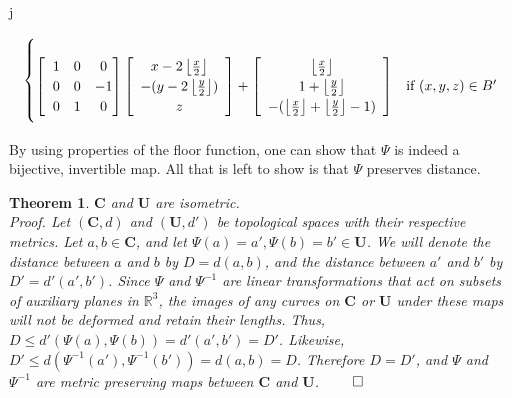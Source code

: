 j\documentclass[]{article}
\newtheorem{thm}{Theorem}[subsection]
\begin{document}
\begin{equation}
\begin{cases}
	\\
	
		\left[ \hspace{2mm} \begin{matrix}
			1 & 0 & 0 \\
			0 & 0 & -1 \\
			0 & 1 & 0
		\end{matrix}\hspace{0mm}\right]
	
		\left[\begin{array}{c}
		x - 2\left\lfloor \frac{x}{2} \right\rfloor
		\\ -(y- 2\left\lfloor \frac{y}{2} \right\rfloor)
		\\ z
		\end{array} \right]
		+
		\left[\begin{array}{c}
			\left\lfloor \frac{x}{2} \right\rfloor
			\\1+ \left\lfloor \frac{y}{2} \right\rfloor
			\\ -(\left\lfloor \frac{x}{2} \right\rfloor + \left\lfloor \frac{y}{2} \right\rfloor -1)
		\end{array} \right]
			& \text{if } (x,y,z)\in B'	\vspace{2mm}
			
	\end{cases}
\end{equation}

By using properties of the floor function, one can show that $\Psi$ is indeed a bijective, invertible map. All that is left to show is that $\Psi$ preserves distance.

\begin{thm}{$\mathbf{C}$ and $\mathbf{U}$ are isometric.}\\
Proof. Let $(\mathbf{C}, d)$ and $(\mathbf{U}, d')$ be topological spaces with their respective metrics. Let $a,b\in\mathbf{C}$, and let $\Psi(a)=a',\Psi(b)=b'\in\mathbf{U}$. We will denote the distance between $a$ and $b$ by $D=d(a,b)$, and the distance between $a'$ and $b'$ by $D'=d'(a',b')$. Since $\Psi$ and $\Psi^{-1}$ are linear transformations that act on subsets of auxiliary planes in $\mathbb{R}^{3}$, the images of any curves on $\mathbf{C}$ or $\mathbf{U}$ under these maps will not be deformed and retain their lengths. Thus, $D \leq d'(\Psi(a), \Psi(b)) = d'(a',b') = D'$. Likewise, $D' \leq d(\Psi^{-1}(a'),\Psi^{-1}(b')) = d(a,b) = D$. Therefore $D=D'$, and $\Psi$ and $\Psi^{-1}$ are metric preserving maps between $\mathbf{C}$ and $\mathbf{U}$. $\qed$
\end{thm}
\end{document}

